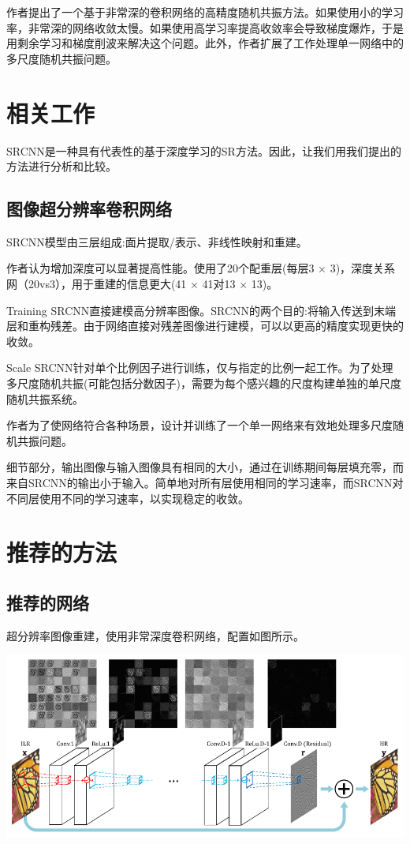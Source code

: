 \documentclass[UTF8,a4paper,10pt]{ctexrep}
\begin{document}
作者提出了一个基于非常深的卷积网络的高精度随机共振方法。如果使用小的学习率，非常深的网络收敛太慢。如果使用高学习率提高收敛率会导致梯度爆炸，于是用剩余学习和梯度削波来解决这个问题。此外，作者扩展了工作处理单一网络中的多尺度随机共振问题。

\section{相关工作}

SRCNN是一种具有代表性的基于深度学习的SR方法。因此，让我们用我们提出的方法进行分析和比较。

\subsection{图像超分辨率卷积网络}

SRCNN模型由三层组成:面片提取/表示、非线性映射和重建。

作者认为增加深度可以显著提高性能。使用了20个配重层(每层3 × 3)，深度关系网（20vs3），用于重建的信息更大(41 × 41对13 × 13)。

Training SRCNN直接建模高分辨率图像。SRCNN的两个目的:将输入传送到末端层和重构残差。由于网络直接对残差图像进行建模，可以以更高的精度实现更快的收敛。

Scale SRCNN针对单个比例因子进行训练，仅与指定的比例一起工作。为了处理多尺度随机共振(可能包括分数因子)，需要为每个感兴趣的尺度构建单独的单尺度随机共振系统。

作者为了使网络符合各种场景，设计并训练了一个单一网络来有效地处理多尺度随机共振问题。

细节部分，输出图像与输入图像具有相同的大小，通过在训练期间每层填充零，而来自SRCNN的输出小于输入。简单地对所有层使用相同的学习速率，而SRCNN对不同层使用不同的学习速率，以实现稳定的收敛。

\section{推荐的方法}
\subsection{推荐的网络}

超分辨率图像重建，使用非常深度卷积网络，配置如图所示。

\includegraphics[width=\textwidth]{figure/peizhi.png}
\end{document}

